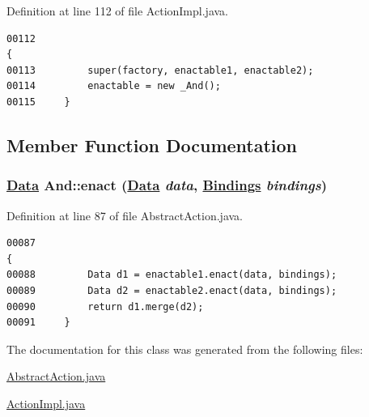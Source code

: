 Definition at line 112 of file Action\-Impl.java.\footnotesize\begin{verbatim}00112                                                                                 {
00113         super(factory, enactable1, enactable2);
00114         enactable = new _And();
00115     }
\end{verbatim}\normalsize 


\subsection{Member Function Documentation}
\hypertarget{classAnd_a1}{
\subsubsection[enact]{\setlength{\rightskip}{0pt plus 5cm}\hyperlink{interfaceData}{Data} And::enact (\hyperlink{interfaceData}{Data} {\em data}, \hyperlink{interfaceBindings}{Bindings} {\em bindings})}}
\label{classAnd_a1}




Definition at line 87 of file Abstract\-Action.java.\footnotesize\begin{verbatim}00087                                                                                {
00088         Data d1 = enactable1.enact(data, bindings);
00089         Data d2 = enactable2.enact(data, bindings);
00090         return d1.merge(d2);
00091     }
\end{verbatim}\normalsize 


The documentation for this class was generated from the following files:\begin{CompactItemize}
\item 
\hyperlink{AbstractAction_8java-source}{Abstract\-Action.java}\item 
\hyperlink{ActionImpl_8java-source}{Action\-Impl.java}\end{CompactItemize}

